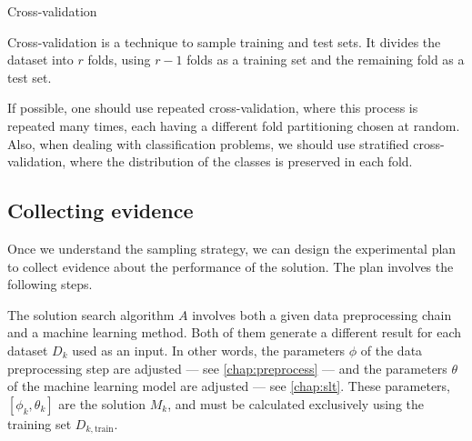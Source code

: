\begin{figurebox}[label=fig:cross-validation]{Cross-validation}
  \centering
  \tcblower
  Cross-validation is a technique to sample training and test sets.  It divides the
  dataset into $r$ folds, using $r-1$ folds as a training set and the remaining fold as a
  test set.
\end{figurebox}

If possible, one should use repeated cross-validation, where this process is repeated many
times, each having a different fold partitioning chosen at random.  Also, when dealing with
classification problems, we should use stratified cross-validation, where the distribution
of the classes is preserved in each fold.


\subsection{Collecting evidence}

Once we understand the sampling strategy, we can design the experimental plan to collect
evidence about the performance of the solution.  The plan involves the following steps.

The solution search algorithm $A$ involves both a
given data preprocessing chain and a machine learning method.  Both of them generate a
different result for each dataset $D_k$ used as an input.  In other words, the parameters
$\phi$ of the data preprocessing step are adjusted --- see \cref{chap:preprocess} --- and the
parameters $\theta$ of the machine learning model are adjusted --- see \cref{chap:slt}.
These parameters, $\left[\phi_k, \theta_k\right]$ are the solution $M_k$, and must be
calculated exclusively using the training set $D_{k,\text{train}}$.


